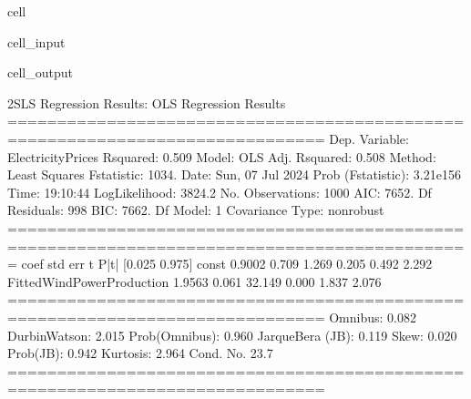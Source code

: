 \documentclass[letterpaper,10pt,english]{jupyterBook}
\begin{document}
\begin{sphinxuseclass}{cell}
\begin{sphinxVerbatimInput}
\begin{sphinxuseclass}{cell_input}
\end{sphinxuseclass}\end{sphinxVerbatimInput}
\begin{sphinxVerbatimOutput}

\begin{sphinxuseclass}{cell_output}
\begin{sphinxVerbatim}[commandchars=\\\{\}]
2SLS Regression Results:
                            OLS Regression Results                            
==============================================================================
Dep. Variable:      ElectricityPrices   R\PYGZhy{}squared:                       0.509
Model:                            OLS   Adj. R\PYGZhy{}squared:                  0.508
Method:                 Least Squares   F\PYGZhy{}statistic:                     1034.
Date:                Sun, 07 Jul 2024   Prob (F\PYGZhy{}statistic):          3.21e\PYGZhy{}156
Time:                        19:10:44   Log\PYGZhy{}Likelihood:                \PYGZhy{}3824.2
No. Observations:                1000   AIC:                             7652.
Df Residuals:                     998   BIC:                             7662.
Df Model:                           1                                         
Covariance Type:            nonrobust                                         
=============================================================================================
                                coef    std err          t      P\PYGZgt{}|t|      [0.025      0.975]
\PYGZhy{}\PYGZhy{}\PYGZhy{}\PYGZhy{}\PYGZhy{}\PYGZhy{}\PYGZhy{}\PYGZhy{}\PYGZhy{}\PYGZhy{}\PYGZhy{}\PYGZhy{}\PYGZhy{}\PYGZhy{}\PYGZhy{}\PYGZhy{}\PYGZhy{}\PYGZhy{}\PYGZhy{}\PYGZhy{}\PYGZhy{}\PYGZhy{}\PYGZhy{}\PYGZhy{}\PYGZhy{}\PYGZhy{}\PYGZhy{}\PYGZhy{}\PYGZhy{}\PYGZhy{}\PYGZhy{}\PYGZhy{}\PYGZhy{}\PYGZhy{}\PYGZhy{}\PYGZhy{}\PYGZhy{}\PYGZhy{}\PYGZhy{}\PYGZhy{}\PYGZhy{}\PYGZhy{}\PYGZhy{}\PYGZhy{}\PYGZhy{}\PYGZhy{}\PYGZhy{}\PYGZhy{}\PYGZhy{}\PYGZhy{}\PYGZhy{}\PYGZhy{}\PYGZhy{}\PYGZhy{}\PYGZhy{}\PYGZhy{}\PYGZhy{}\PYGZhy{}\PYGZhy{}\PYGZhy{}\PYGZhy{}\PYGZhy{}\PYGZhy{}\PYGZhy{}\PYGZhy{}\PYGZhy{}\PYGZhy{}\PYGZhy{}\PYGZhy{}\PYGZhy{}\PYGZhy{}\PYGZhy{}\PYGZhy{}\PYGZhy{}\PYGZhy{}\PYGZhy{}\PYGZhy{}\PYGZhy{}\PYGZhy{}\PYGZhy{}\PYGZhy{}\PYGZhy{}\PYGZhy{}\PYGZhy{}\PYGZhy{}\PYGZhy{}\PYGZhy{}\PYGZhy{}\PYGZhy{}\PYGZhy{}\PYGZhy{}\PYGZhy{}\PYGZhy{}
const                         0.9002      0.709      1.269      0.205      \PYGZhy{}0.492       2.292
FittedWindPowerProduction     1.9563      0.061     32.149      0.000       1.837       2.076
==============================================================================
Omnibus:                        0.082   Durbin\PYGZhy{}Watson:                   2.015
Prob(Omnibus):                  0.960   Jarque\PYGZhy{}Bera (JB):                0.119
Skew:                          \PYGZhy{}0.020   Prob(JB):                        0.942
Kurtosis:                       2.964   Cond. No.                         23.7
==============================================================================


\end{sphinxVerbatim}
\end{sphinxuseclass}
\end{sphinxVerbatimOutput}
\end{sphinxuseclass}
\end{document}
